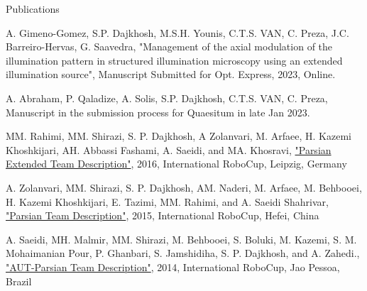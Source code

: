 \begin{cventries}
    
    \cventry
    {} %
    {Publications} %
    {} %
    {} %
    {
      \begin{cvitems} %
        \item{A. Gimeno-Gomez, S.P. Dajkhosh, M.S.H. Younis, C.T.S. VAN, C. Preza, J.C. Barreiro-Hervas, G. Saavedra, "Management of the axial modulation of the illumination pattern in structured illumination microscopy using an extended illumination source", Manuscript Submitted for Opt. Express, 2023, Online.}
        \item{A. Abraham, P. Qaladize, A. Solis, S.P. Dajkhosh, C.T.S. VAN, C. Preza, Manuscript in the submission process for Quaesitum in late Jan 2023.}
        \item{MM. Rahimi, MM. Shirazi, S. P. Dajkhosh, A Zolanvari, M. Arfaee, H. Kazemi Khoshkijari, AH. Abbassi Fashami, A. Saeidi, and MA. Khosravi, \href{https://sites.google.com/view/steacher/amirkabir-university}{"Parsian Extended Team Description"}, 2016, International RoboCup, Leipzig, Germany}
        \item{A. Zolanvari, MM. Shirazi, S. P. Dajkhosh, AM. Naderi, M. Arfaee, M. Behbooei, H. Kazemi Khoshkijari, E. Tazimi, MM. Rahimi, and A. Saeidi Shahrivar, \href{https://sites.google.com/view/steacher/amirkabir-university}{"Parsian Team Description"}, 2015, International RoboCup, Hefei, China}
        \item{A. Saeidi, MH. Malmir, MM.  Shirazi, M.
        Behbooei, S. Boluki, M. Kazemi, S. M. Mohaimanian Pour, P. Ghanbari, S. Jamshidiha, S. P. Dajkhosh, and A. Zahedi., \href{https://sites.google.com/view/steacher/amirkabir-university}{"AUT-Parsian Team Description"}, 2014, International RoboCup, Jao Pessoa, Brazil}
      \end{cvitems}
    }


\end{cventries}
